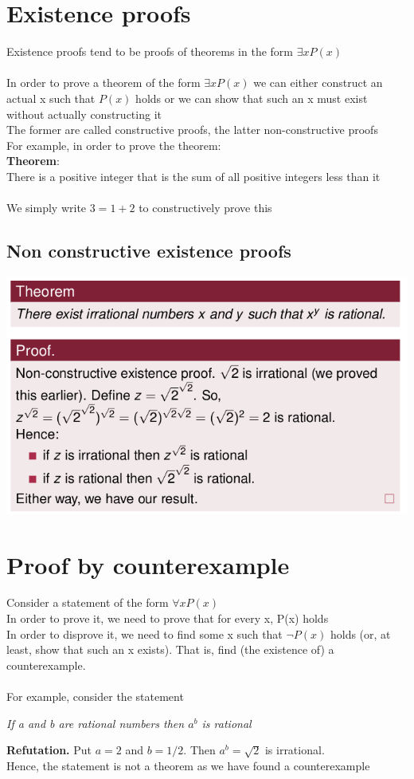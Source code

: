 \documentclass{article}[18pt]
\begin{document}
\section{Existence proofs}
Existence proofs tend to be proofs of theorems in the form $\exists x P(x)$\\
\\
In order to prove a theorem of the form $\exists x P(x)$ we can either construct an actual x such that $P(x)$ holds or we can show that such an x must exist without actually constructing it\\
The former are called constructive proofs, the latter non-constructive proofs\\
For example, in order to prove the theorem:\\
\textbf{Theorem}:\\
There is a positive integer that is the sum of all positive integers less than it\\
\\
We simply write $3=1+2$ to constructively prove this
\subsection{Non constructive existence proofs}
\begin{center}
	\includegraphics[scale=0.7]{existence}
\end{center}

\section{Proof by counterexample}
Consider a statement of the form $\forall x P(x)$\\
In order to prove it, we need to prove that for every x, P(x) holds\\
In order to disprove it, we need to find some x such that $\lnot P(x)$ holds (or, at least, show that such an x exists). That is, find (the existence of) a counterexample.\\
\\
For example, consider the statement
\begin{center}
	\textit{If a and b are rational numbers then $a^b$ is rational}
\end{center}
\textbf{Refutation.} Put $a=2$ and $b=1/2$. Then $a^b=\sqrt{2}$ is irrational.\\
Hence, the statement is not a theorem as we have found a counterexample
\end{document}

